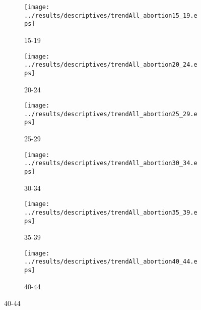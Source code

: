 \documentclass[12pt]{article}
\begin{document}
\begin{figure}[htpb!]
  \caption{Descriptive Figures by Quinquennial Age Groups (Abortion)}
  \label{fig:abort5y}
  \begin{center}
    \begin{subfigure}{0.49\textwidth}
      \texttt{[image: ../results/descriptives/trendAll\_abortion15\_19.eps]}
      \caption{15-19}
    \end{subfigure}
    \begin{subfigure}{0.49\textwidth}
      \texttt{[image: ../results/descriptives/trendAll\_abortion20\_24.eps]}
      \caption{20-24}
    \end{subfigure}

    \begin{subfigure}{0.49\textwidth}
      \texttt{[image: ../results/descriptives/trendAll\_abortion25\_29.eps]}
      \caption{25-29}
    \end{subfigure}
    \begin{subfigure}{0.49\textwidth}
      \texttt{[image: ../results/descriptives/trendAll\_abortion30\_34.eps]}
      \caption{30-34}
    \end{subfigure}

        \begin{subfigure}{0.49\textwidth}
      \texttt{[image: ../results/descriptives/trendAll\_abortion35\_39.eps]}
      \caption{35-39}
    \end{subfigure}
    \begin{subfigure}{0.49\textwidth}
      \texttt{[image: ../results/descriptives/trendAll\_abortion40\_44.eps]}
      \caption{40-44}
    \end{subfigure}
  \end{center}
  \end{figure}
\end{document}
